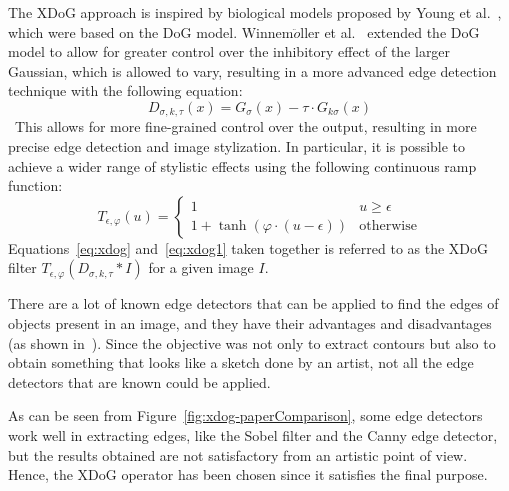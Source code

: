 \noindent The XDoG approach is inspired by biological models proposed by Young et al.~\cite{GaussianDerivativeModel}, which were based on the DoG model. Winnem$\ddot o$ller et al.~\cite{RealTimeVideoAbstraction} extended the DoG model to allow for greater control over the inhibitory effect of the larger Gaussian, which is allowed to vary, resulting in a more advanced edge detection technique with the following equation:
\begin{equation}
    D_{\sigma, k,\tau}(x)=G_{\sigma}(x)-\tau \cdot G_{k\sigma}(x)
    \label{eq:xdog}
\end{equation}
 This allows for more fine-grained control over the output, resulting in more precise edge detection and image stylization. In particular, it is possible to achieve a wider range of stylistic effects using the following continuous ramp function:
 \begin{equation}
     T_{\epsilon, \varphi}(u) = 
     \begin{cases}
        1 & u \ge \epsilon \\
        1+ \tanh (\varphi \cdot (u-\epsilon)) & \mbox{otherwise}
    \end{cases}
\label{eq:xdog1}
 \end{equation}
Equations~\ref{eq:xdog} and~\ref{eq:xdog1} taken together is referred to as the XDoG filter $T_{\epsilon, \varphi}(D_{\sigma, k, \tau }*I)$ for a given image $I$. 

\noindent There are a lot of known edge detectors that can be applied to find the edges of objects present in an image, and they have their advantages and disadvantages (as shown in~\cite{xdog}). Since the objective was not only to extract contours but also to obtain something that looks like a sketch done by an artist, not all the edge detectors that are known could be applied. 

\noindent As can be seen from Figure~\ref{fig:xdog-paperComparison}, some edge detectors work well in extracting edges, like the Sobel filter and the Canny edge detector, but the results obtained are not satisfactory from an artistic point of view. Hence, the XDoG operator has been chosen since it satisfies the final purpose.

